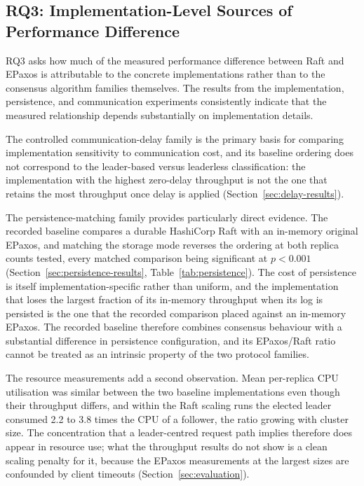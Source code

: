 \subsection{RQ3: Implementation-Level Sources of Performance Difference}

RQ3 asks how much of the measured performance difference between Raft and
EPaxos is attributable to the concrete implementations rather than to the
consensus algorithm families themselves. The results from the implementation,
persistence, and communication experiments consistently indicate that the
measured relationship depends substantially on implementation details.

The controlled communication-delay family is the primary basis for
comparing implementation sensitivity to communication cost, and its
baseline ordering does not correspond to the leader-based versus leaderless
classification: the implementation with the highest zero-delay throughput is
not the one that retains the most throughput once delay is applied
(Section~\ref{sec:delay-results}).

The persistence-matching family provides particularly direct evidence. The
recorded baseline compares a durable HashiCorp Raft with an in-memory
original EPaxos, and matching the storage mode reverses the ordering at both
replica counts tested, every matched comparison being significant at
$p<0.001$ (Section~\ref{sec:persistence-results},
Table~\ref{tab:persistence}). The cost of persistence is itself
implementation-specific rather than uniform, and the implementation that
loses the largest fraction of its in-memory throughput when its log is
persisted is the one that the recorded comparison placed against an
in-memory EPaxos. The recorded baseline therefore combines consensus
behaviour with a substantial difference in persistence configuration, and
its EPaxos/Raft ratio cannot be treated as an intrinsic property of the two
protocol families.

The resource measurements add a second observation. Mean per-replica CPU
utilisation was similar between the two baseline implementations even though
their throughput differs, and within the Raft scaling runs the elected leader
consumed 2.2 to 3.8 times the CPU of a follower, the ratio growing with
cluster size. The concentration that a leader-centred request path implies
therefore does appear in resource use; what the throughput results do not
show is a clean scaling penalty for it, because the EPaxos measurements at
the largest sizes are confounded by client timeouts
(Section~\ref{sec:evaluation}).

